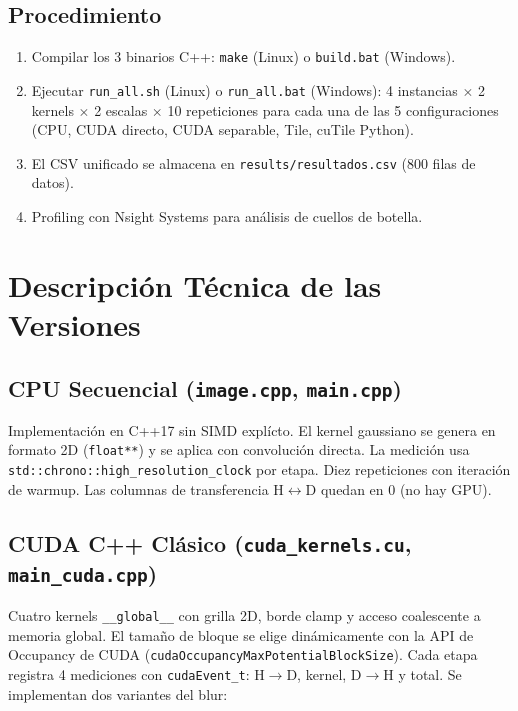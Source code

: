 \documentclass[12pt,a4paper]{article}
\begin{document}
\subsection{Procedimiento}

\begin{enumerate}
  \item Compilar los 3 binarios C++: \texttt{make} (Linux) o \texttt{build.bat} (Windows).
  \item Ejecutar \texttt{run\_all.sh} (Linux) o \texttt{run\_all.bat} (Windows): 4 instancias $\times$ 2 kernels $\times$ 2 escalas $\times$ 10 repeticiones para cada una de las 5 configuraciones (CPU, CUDA directo, CUDA separable, Tile, cuTile Python).
  \item El CSV unificado se almacena en \texttt{results/resultados.csv} (800 filas de datos).
  \item Profiling con Nsight Systems para an\'alisis de cuellos de botella.
\end{enumerate}

\section{Descripci\'on T\'ecnica de las Versiones}

\subsection{CPU Secuencial (\texttt{image.cpp}, \texttt{main.cpp})}

Implementaci\'on en C++17 sin SIMD expl\'icto. El kernel gaussiano se genera en formato 2D (\texttt{float**}) y se aplica con convoluci\'on directa. La medici\'on usa \texttt{std::chrono::}\-\texttt{high\_resolution\_clock} por etapa. Diez repeticiones con iteraci\'on de warmup. Las columnas de transferencia H$\leftrightarrow$D quedan en 0 (no hay GPU).

\subsection{CUDA C++ Cl\'asico (\texttt{cuda\_kernels.cu}, \texttt{main\_cuda.cpp})}

Cuatro kernels \texttt{\_\_global\_\_} con grilla 2D, borde clamp y acceso coalescente a memoria global. El tama\~no de bloque se elige din\'amicamente con la API de Occupancy de CUDA (\texttt{cudaOccupancy\-MaxPotential\-BlockSize}). Cada etapa registra 4 mediciones con \texttt{cudaEvent\_t}: H$\rightarrow$D, kernel, D$\rightarrow$H y total. Se implementan dos variantes del blur:
\end{document}
